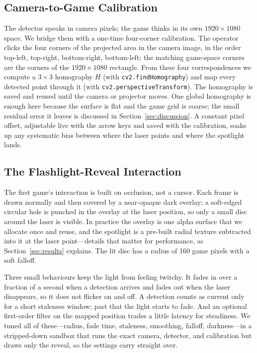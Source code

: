 \documentclass[conference]{IEEEtran}
\begin{document}
\subsection{Camera-to-Game Calibration}\label{sec:calib}
The detector speaks in camera pixels; the game thinks in its own
$1920\times1080$ space. We bridge them with a one-time four-corner calibration.
The operator clicks the four corners of the projected area in the camera image,
in the order top-left, top-right, bottom-right, bottom-left; the matching
game-space corners are the corners of the $1920\times1080$ rectangle. From these
four correspondences we compute a $3\times3$ homography $H$ (with
\texttt{cv2.findHomography}) and map every detected point through it (with
\texttt{cv2.perspectiveTransform}). The homography is saved and reused until the
camera or projector moves. One global homography is enough here because the
surface is flat and the game grid is coarse; the small residual error it leaves is
discussed in Section~\ref{sec:discussion}. A constant pixel offset, adjustable
live with the arrow keys and saved with the calibration, soaks up any systematic
bias between where the laser points and where the spotlight lands.

\subsection{The Flashlight-Reveal Interaction}\label{sec:reveal}
The first game's interaction is built on occlusion, not a cursor. Each frame is
drawn normally and then covered by a near-opaque dark overlay; a soft-edged
circular hole is punched in the overlay at the laser position, so only a small
disc around the laser is visible. In practice the overlay is one alpha surface
that we allocate once and reuse, and the spotlight is a pre-built radial texture
subtracted into it at the laser point---details that matter for performance, as
Section~\ref{sec:results} explains. The lit disc has a radius of 160 game pixels
with a soft falloff.

Three small behaviours keep the light from feeling twitchy. It fades in over a
fraction of a second when a detection arrives and fades out when the laser
disappears, so it does not flicker on and off. A detection counts as current only
for a short staleness window; past that the light starts to fade. And an optional
first-order filter on the mapped position trades a little latency for steadiness.
We tuned all of these---radius, fade time, staleness, smoothing, falloff,
darkness---in a stripped-down sandbox that runs the exact camera, detector, and
calibration but draws only the reveal, so the settings carry straight over.
\end{document}
